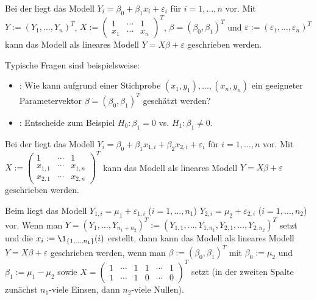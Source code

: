 \begin{Bsp}
    Bei der 
    liegt das Modell $Y_i = \beta_0 + \beta_1 x_i + \varepsilon_i$ für $i = 1, \dotsc, n$ vor.
    Mit $Y := (Y_1, \dotsc, Y_n)^T$,
    $X := \begin{pmatrix}1 & \cdots & 1\\x_1 & \cdots & x_n\end{pmatrix}^T$,
    $\beta = (\beta_0, \beta_1)^T$ und
    $\varepsilon := (\varepsilon_1, \dotsc, \varepsilon_n)^T$
    kann das Modell als lineares Modell $Y = X\beta + \varepsilon$ geschrieben werden.
    
    Typische Fragen sind beispielsweise:
    \begin{itemize}
        \item
        : Wie kann aufgrund einer Stichprobe
        $(x_1, y_1), \dotsc, (x_n, y_n)$ ein geeigneter Parametervektor
        $\beta = (\beta_0, \beta_1)^T$ geschätzt werden?
        
        \item
        : Entscheide zum Beispiel
        $H_0\colon \beta_1 = 0$ vs. $H_1\colon \beta_1 \not= 0$.
    \end{itemize}
\end{Bsp}

\linie

\begin{Bsp}
    Bei der  liegt das Modell
    $Y_i = \beta_0 + \beta_1 x_{1,i} + \beta_2 x_{2,i} + \varepsilon_i$
    für $i = 1, \dotsc, n$ vor.
    Mit $X := \begin{pmatrix}1 & \cdots & 1\\x_{1,1} & \cdots & x_{1,n}\\x_{2,1} & \cdots & x_{2,n}
    \end{pmatrix}^T$
    kann das Modell als lineares Modell $Y = X\beta + \varepsilon$ geschrieben werden.
\end{Bsp}

\linie

\begin{Bsp}
    Beim  liegt das Modell
    $Y_{1,i} = \mu_1 + \varepsilon_{1,i}$ ($i = 1, \dotsc, n_1$)
    $Y_{2,i} = \mu_2 + \varepsilon_{2,i}$ ($i = 1, \dotsc, n_2$) vor.
    Wenn man $Y = (Y_1, \dotsc, Y_{n_1+n_2})^T := (Y_{1,1}, \dotsc, Y_{1,n_1},
    Y_{2,1}, \dotsc, Y_{2,n_2})^T$ setzt und die 
    $x_i := \1_{\{1, \dotsc, n_1\}}(i)$ erstellt, dann
    kann das Modell als lineares Modell $Y = X\beta + \varepsilon$ geschrieben werden,
    wenn man $\beta := (\beta_0, \beta_1)^T$ mit $\beta_0 := \mu_2$ und $\beta_1 := \mu_1 - \mu_2$
    sowie $X = \begin{pmatrix}1 & \cdots & 1 & 1 & \cdots & 1\\1 & \cdots & 1 & 0 & \cdots & 0
    \end{pmatrix}^T$ setzt
    (in der zweiten Spalte zunächst $n_1$-viele Einsen, dann $n_2$-viele Nullen).
\end{Bsp}

